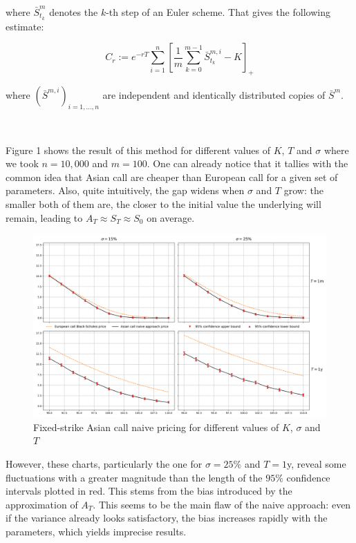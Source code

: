 \documentclass{article}
\begin{document}
where $\bar S_{t_k}^m$ denotes the $k$-th step of an Euler scheme. That gives the following estimate:

\begin{equation}
	C_r := e^{-rT} \sum_{i=1}^n \left[ \frac{1}{m} \sum_{k=0}^{m-1} \bar S_{t_k}^{m, i} - K \right]_+
	\tag{1}
\end{equation}

where $\left( \bar S^{m, i} \right)_{i = 1, \dots, n}$ are independent and identically distributed copies of $\bar S^m$.

\

Figure 1 shows the result
of this method for different values of $K$, $T$ and $\sigma$ where we took $n =10,000$ and $m=100$.
One can already notice that it tallies with the common idea that Asian call are cheaper than European call
for a given set of parameters. Also, quite intuitively, the gap widens when $\sigma$ and $T$ grow: the smaller
both of them are, the closer to the initial value the underlying will remain, leading to $A_T \approx S_T \approx S_0$
on average.

\begin{figure}[H]
  \hspace*{-0.02\linewidth}\includegraphics[width=1.065\textwidth]{charts/prices.png}
  \caption{Fixed-strike Asian call naive pricing for different values of $K$, $\sigma$ and $T$}
\end{figure}

However, these charts, particularly the one for $\sigma = 25\%$ and $T=1$y, reveal some fluctuations with
a greater magnitude than the length of the $95\%$ confidence intervals plotted in red. This stems from the bias
introduced by the approximation of $A_T$. This seems to be the main flaw of the
naive approach: even if the variance already looks satisfactory, the bias increases rapidly with the parameters, which
yields imprecise results.
\end{document}
